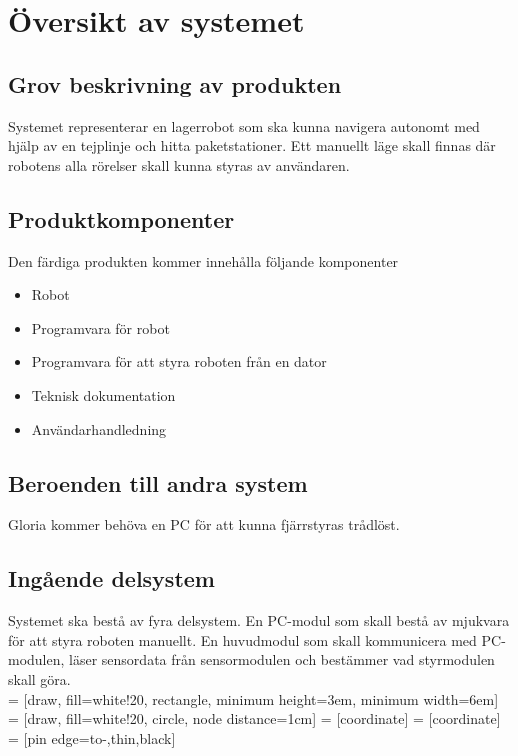 \section{Översikt av systemet}

\subsection{Grov beskrivning av produkten}
Systemet representerar en lagerrobot som ska kunna navigera autonomt med hjälp av en tejplinje och hitta paketstationer. Ett manuellt läge skall finnas där robotens alla rörelser skall kunna styras av användaren.

\subsection{Produktkomponenter}
Den färdiga produkten kommer innehålla följande komponenter
\begin{itemize}
\item{Robot}
\item{Programvara för robot}
\item{Programvara för att styra roboten från en dator}
\item{Teknisk dokumentation}
\item{Användarhandledning}
\end{itemize}

\subsection{Beroenden till andra system}
Gloria kommer behöva en PC för att kunna fjärrstyras trådlöst.

\subsection{Ingående delsystem}
Systemet ska bestå av fyra delsystem. En PC-modul som skall bestå av mjukvara för att styra roboten manuellt. En huvudmodul som skall kommunicera med PC-modulen, läser sensordata från sensormodulen och bestämmer vad styrmodulen skall göra. \\

 = [draw, fill=white!20, rectangle, 
    minimum height=3em, minimum width=6em]
 = [draw, fill=white!20, circle, node distance=1cm]
 = [coordinate]
 = [coordinate]
 = [pin edge={to-,thin,black}]


